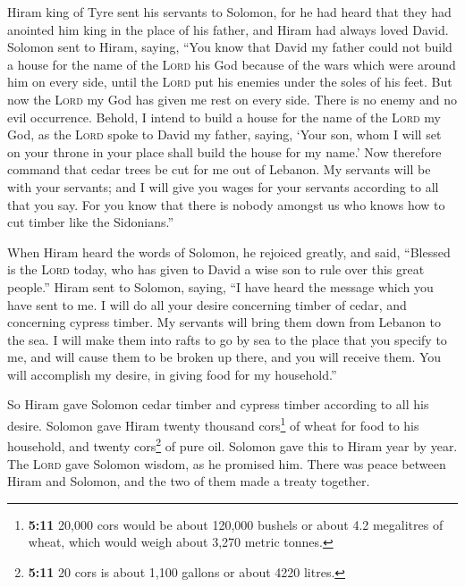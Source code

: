  Hiram king of Tyre sent his servants to Solomon, for he
had heard that they had anointed him king in the place of his father,
and Hiram had always loved David.  Solomon sent to Hiram,
saying,  ``You know that David my father could not build a
house for the name of the \textsc{Lord} his God because of the wars
which were around him on every side, until the \textsc{Lord} put his
enemies under the soles of his feet.  But now the
\textsc{Lord} my God has given me rest on every side. There is no enemy
and no evil occurrence.  Behold, I intend to build a house
for the name of the \textsc{Lord} my God, as the \textsc{Lord} spoke to
David my father, saying, `Your son, whom I will set on your throne in
your place shall build the house for my name.'  Now
therefore command that cedar trees be cut for me out of Lebanon. My
servants will be with your servants; and I will give you wages for your
servants according to all that you say. For you know that there is
nobody amongst us who knows how to cut timber like the Sidonians.''

 When Hiram heard the words of Solomon, he rejoiced
greatly, and said, ``Blessed is the \textsc{Lord} today, who has given
to David a wise son to rule over this great people.'' 
Hiram sent to Solomon, saying, ``I have heard the message which you have
sent to me. I will do all your desire concerning timber of cedar, and
concerning cypress timber.  My servants will bring them
down from Lebanon to the sea. I will make them into rafts to go by sea
to the place that you specify to me, and will cause them to be broken up
there, and you will receive them. You will accomplish my desire, in
giving food for my household.''

 So Hiram gave Solomon cedar timber and cypress timber
according to all his desire.  Solomon gave Hiram twenty
thousand cors\footnote{\textbf{5:11} 20,000 cors would be about 120,000
  bushels or about 4.2 megalitres of wheat, which would weigh about
  3,270 metric tonnes.} of wheat for food to his household, and twenty
cors\footnote{\textbf{5:11} 20 cors is about 1,100 gallons or about 4220
  litres.} of pure oil. Solomon gave this to Hiram year by year.
 The \textsc{Lord} gave Solomon wisdom, as he promised
him. There was peace between Hiram and Solomon, and the two of them made
a treaty together.

